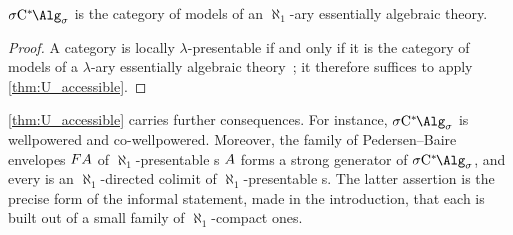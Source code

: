 \begin{corollary}\label{cor:essentially_algebraic}
	$\SigmaC$ is the category of models of an $\aleph_1$-ary essentially algebraic theory.
\end{corollary}
\begin{proof}
		A category is locally $\lambda$-presentable if and only if it is the category of models of a $\lambda$-ary essentially algebraic theory~\cite[Theorem 3.36]{adamek1994locallypresentable}; it therefore suffices to apply \cref{thm:U_accessible}.
\end{proof}

\begin{remark}\label{rem:presentability_consequences}
\cref{thm:U_accessible} carries further consequences. 
For instance, $\SigmaC$ is wellpowered and co-wellpowered. 
Moreover, the family of Pedersen--Baire envelopes $F{A}$ of $\aleph_1$-presentable \cstar{}s ${A}$ forms a strong generator of $\SigmaC$, and every \cstars{} is an $\aleph_1$-directed colimit of $\aleph_1$-presentable \cstars{}s.
The latter assertion is the precise form of the informal statement, made in the introduction, that each \cstars{} is built out of a small family of $\aleph_1$-compact ones.
\end{remark}


